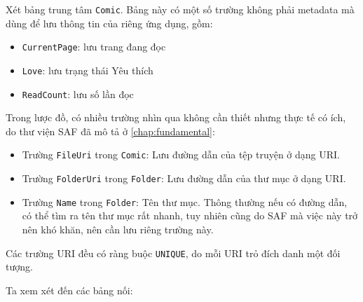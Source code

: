 \documentclass[../../../../thesis]{subfiles}
\begin{document}
Xét bảng trung tâm \texttt{Comic}. Bảng này có một số trường không phải metadata
mà dùng để lưu thông tin của riêng ứng dụng, gồm:

\begin{itemize}
    \item
        \texttt{CurrentPage}: lưu trang đang đọc
    \item
        \texttt{Love}: lưu trạng thái Yêu thích
    \item
        \texttt{ReadCount}: lưu số lần đọc
\end{itemize}

Trong lược đồ, có nhiều trường nhìn qua không cần thiết nhưng thực tế có ích, do
thư viện SAF đã mô tả ở \autoref{chap:fundamental}:

\begin{itemize}
    \item
        Trường \texttt{FileUri} trong \texttt{Comic}: Lưu đường dẫn của tệp
        truyện ở dạng URI.
    \item
        Trường \texttt{FolderUri} trong \texttt{Folder}: Lưu đường dẫn của thư
        mục ở dạng URI.
\end{itemize}

\begin{itemize}[resume, before = \vspace*{-\dimexpr\topsep+\partopsep\relax}]
    \item
        Trường \texttt{Name} trong \texttt{Folder}: Tên thư mục. Thông thường
        nếu có đường dẫn, có thể tìm ra tên thư mục rất nhanh, tuy nhiên cũng do
        SAF mà việc này trở nên khó khăn, nên cần lưu riêng trường này.
\end{itemize}

Các trường URI đều có ràng buộc \texttt{UNIQUE}, do mỗi URI trỏ đích danh một
đối tượng.

Ta xem xét đến các bảng nối:
\end{document}

